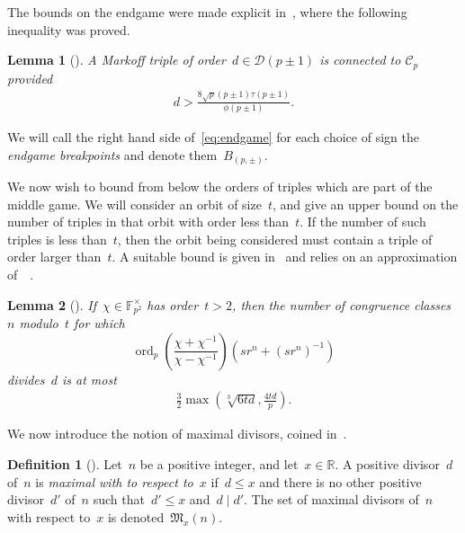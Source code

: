 \documentclass{article}
\DeclareMathOperator{\ord}{ord}
\newtheorem{lemma}{Lemma}
\theoremstyle{definition}
\newtheorem{definition}{Definition}
\theoremstyle{remark}
\begin{document}
The bounds on the endgame were made explicit in~\cite{fuchs}, where the following inequality was proved.

\begin{lemma}[{\cite[Proposition 6.1]{fuchs}}]\label{lem:endgame}
    A Markoff triple of order~$d \in \mathcal{D}(p \pm 1)$ is connected to $\mathcal{C}_p$ provided
    \begin{align}
        d > \frac{8\sqrt{p}(p \pm 1)\tau(p \pm 1)}{\phi(p \pm 1)}. \label{eq:endgame}
    \end{align}
\end{lemma}

We will call the right hand side of~\eqref{eq:endgame} for each choice of sign the \textit{endgame breakpoints} and denote them~$B_{(p,\pm)}$.

We now wish to bound from below the orders of triples which are part of the middle game.
We will consider an orbit of size~$t$, and give an upper bound on the number of triples in that orbit with order less than~$t$.
If the number of such triples is less than~$t$, then the orbit being considered must contain a triple of order larger than~$t$.
A suitable bound is given in~\cite{fuchs} and relies on an approximation of~\citeauthor{gcd-finite-fields}~\cite{gcd-finite-fields}.

\begin{lemma}[{\cite[Lemma 2.1]{fuchs}}]
        If~$\chi \in \mathbb{F}_{p^2}^\times$ has order~$t > 2$, then the number of congruence classes~$n$ modulo~$t$ for which
        \[ \ord_p\left(\frac{\chi + \chi^{-1}}{\chi - \chi^{-1}}\right){\left(sr^n + {(sr^n)}^{-1}\right)} \]
        divides~$d$ is at most
        \begin{align}
            \frac{3}{2}\max\left(\sqrt[3]{6td}, \frac{4td}{p}\right). \label{eq:cz-bounds}
        \end{align}
\end{lemma}

We now introduce the notion of maximal divisors, coined in~\cite{fuchs}.

\begin{definition}[{\cite[Definition 1.2]{fuchs}}]
    Let~$n$ be a positive integer, and let~$x \in \mathbb{R}$.
    A positive divisor~$d$ of~$n$ is \textit{maximal with to respect to~$x$} if~$d \leq x$ and there is no other positive divisor~$d'$ of~$n$ such that~$d' \leq x$ and~$d \mid d'$.
    The set of maximal divisors of~$n$ with respect to~$x$ is denoted~$\mathfrak{M}_x(n)$.
\end{definition}
\end{document}
